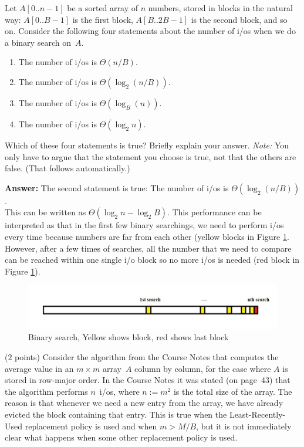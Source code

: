 \documentclass{article}
\newcommand{\io}{{\sc i/o}\xspace}
\newcommand{\ios}{{\io}s\xspace}
\newcounter{rcounter}
\newenvironment{rlist}%
{\begin{list}{\setnr-\arabic{rcounter}}{\usecounter{rcounter}}}{\end{list}}
\begin{document}
\begin{rlist}
        Let $A[0..n-1]$ be a sorted array of $n$ numbers, stored in blocks in the natural way: $A[0..B-1]$ is the first block, $A[B..2B-1]$ is the second block, and so on. Consider the following four statements about the number of \ios when we do a binary search on~$A$.
        \begin{enumerate}
            \item[(I)]
            The number of \ios is $\Theta(n/B)$.
            \item[(II)]
            The number of \ios is $\Theta(\log_2 (n/B))$.
            \item[(III)]
            The number of \ios is $\Theta(\log_B(n))$.
            \item[(IV)]
            The number of \ios is $\Theta(\log_2 n)$.
        \end{enumerate}
        Which of these four statements is true? Briefly explain your answer. \emph{Note:} You only have to argue that the statement you choose is true, not that the others are false. (That follows automatically.)
        
        \textbf{Answer:}
        The second statement is true: The number of \ios is $\Theta(\log_2 (n/B))$.\\
        This can be written as $\Theta(\log_2n-\log_2B)$. This performance can be interpreted as that in the first few binary searchings, we need to perform \ios every time because numbers are far from each other (yellow blocks in Figure \ref{fig:bs}. However, after a few times of searches, all the number that we need to compare can be reached within one single \io block so no more \ios is needed (red block in Figure \ref{fig:bs}).
        \begin{figure}[h]
            \includegraphics[width=\linewidth]{figs/I_2.jpg}
            \caption{Binary search, Yellow shows block, red shows last block}
            \label{fig:bs}
        \end{figure}
        
        \item ($2$ points)
        Consider the algorithm from the Course Notes that computes the average value in an $m\times m$ array~$A$ column by column, for the case where $A$ is stored in row-major order. In the Course Notes it was stated (on page~43) that the algorithm performs $n$~\ios, where $n := m^2$ is the total size of the array. The reason is that whenever we need a new entry from the array, we have already evicted the block containing that entry. This is true when the Least-Recently-Used replacement policy is used and when $m > M/B$, but it is not immediately clear what happens when some other replacement policy is used.
        

\end{rlist}
\end{document}
